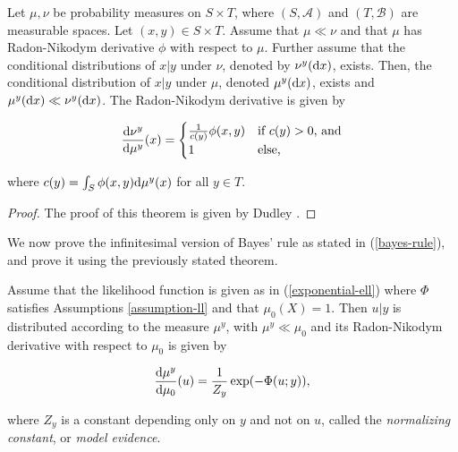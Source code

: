 \begin{theorem}
  \label{duley}
  Let $\mu, \nu$ be probability measures on $S \times T$, where $(S, \mathcal{A})$ and $(T, \mathcal{B})$ are measurable spaces. Let $(x, y) \in S \times T$. Assume that $\mu \ll \nu$ and that $\mu$ has Radon-Nikodym derivative $\phi$ with respect to $\mu$. Further assume that the conditional distributions of $x|y$ under $\nu$, denoted by $\nu^y(\text{d} x)$, exists. Then, the conditional distribution of $x|y$ under $\mu$, denoted $\mu^y(\text{d} x)$, exists and $\mu^y(\text{d} x) \ll \nu^y(\text{d} x)$. The Radon-Nikodym derivative is given by

  \begin{equation}
    \frac{\text{d} \nu^y}{\text{d} \mu^y}(x) =  \begin{cases}
      \frac1{c(y)}\phi(x,y) & \text{if $c(y) > 0$, and}\\
      1 & \text{else,}
    \end{cases}  
  \end{equation}

  where $c(y) = \int_{S}\phi(x,y)\text{d} \mu^y(x)$ for all $y \in T$.
\end{theorem}

\begin{proof}
  The proof of this theorem is given by Dudley \cite{dudley_2002}.
\end{proof}

We now prove the infinitesimal version of Bayes' rule as stated in (\ref{bayes-rule}), and prove it using the previously stated theorem.

\begin{theorem}
  Assume that the likelihood function is given as in (\ref{exponential-ell}) where $\Phi$ satisfies Assumptions \ref{assumption-ll} and that $\mu_0(X) = 1$. Then $u | y$ is distributed according to the measure $\mu^y$, with $\mu^y \ll \mu_0$ and its Radon-Nikodym derivative with respect to $\mu_0$ is given by

  \begin{equation}
    \frac{\text{d} \mu^y}{\text{d} \mu_0}(u) = \frac1{Z_y}\exp(-\Phi(u;y)),
  \end{equation}

  where $Z_y$ is a constant depending only on $y$ and not on $u$, called the \textit{normalizing constant}, or \textit{model evidence}.
\end{theorem}

